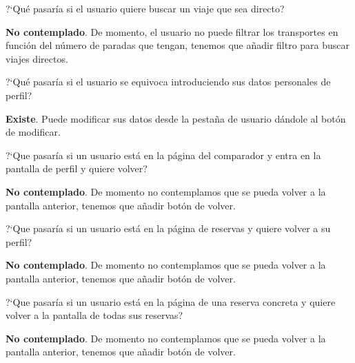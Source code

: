\begin{escenario} %
      \centering
      ?`Qué pasaría si el usuario quiere buscar un viaje que sea directo?
      \begin{solucion} \centering
            \textbf{No contemplado}. De momento, el usuario no puede filtrar los transportes en función del número de paradas que tengan, tenemos que añadir filtro para buscar viajes directos.
      \end{solucion}
\end{escenario}

\begin{escenario} %
      \centering
      ?`Qué pasaría si el usuario se equivoca introduciendo sus datos personales de perfil?

      \begin{solucion} \centering
            \textbf{Existe}. Puede modificar sus datos desde la pestaña de usuario dándole al botón de modificar.
      \end{solucion}
\end{escenario}

\begin{escenario} %
      \centering
      ?`Que pasaría si un usuario está en la página del comparador y entra en la pantalla de perfil y quiere volver?

      \begin{solucion} \centering
            \textbf{No contemplado}. De momento no contemplamos que se pueda volver a la pantalla anterior, tenemos que añadir botón de volver.
      \end{solucion}
\end{escenario}

\begin{escenario} %
      \centering
      ?`Que pasaría si un usuario está en la página de reservas y quiere volver a su perfil?

      \begin{solucion} \centering
            \textbf{No contemplado}. De momento no contemplamos que se pueda volver a la pantalla anterior, tenemos que añadir botón de volver.
      \end{solucion}
\end{escenario}

\begin{escenario} %
      \centering
      ?`Que pasaría si un usuario está en la página de una reserva concreta y quiere volver a la pantalla de todas sus reservas?

      \begin{solucion} \centering
            \textbf{No contemplado}. De momento no contemplamos que se pueda volver a la pantalla anterior, tenemos que añadir botón de volver.
      \end{solucion}
\end{escenario}

